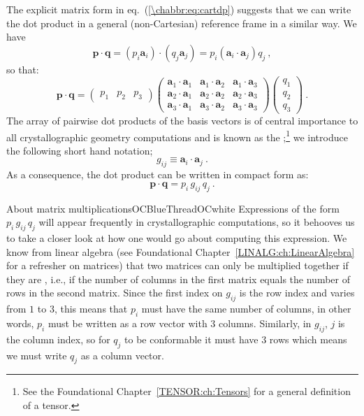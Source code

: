 The explicit matrix form in eq.~(\ref{\chabbr:eq:cartdp}) suggests that we can write the dot product in a general (non-Cartesian) reference frame in a similar way. We have
\[
	\mathbf{p}\cdot\mathbf{q} = (p_i\mathbf{a}_i)\cdot (q_j\mathbf{a}_j) = p_i(\mathbf{a}_i\cdot\mathbf{a}_j) q_j\ ,
\]
so that:
\begin{equation}
\mathbf{p}\cdot\mathbf{q} = \begin{pmatrix}p_1&p_2&p_3\end{pmatrix}\begin{pmatrix}	
	\mathbf{a}_1\cdot\mathbf{a}_1 & \mathbf{a}_1\cdot\mathbf{a}_2 & \mathbf{a}_1\cdot\mathbf{a}_3 \\
	\mathbf{a}_2\cdot\mathbf{a}_1 & \mathbf{a}_2\cdot\mathbf{a}_2 & \mathbf{a}_2\cdot\mathbf{a}_3 \\
	\mathbf{a}_3\cdot\mathbf{a}_1 & \mathbf{a}_3\cdot\mathbf{a}_2 & \mathbf{a}_3\cdot\mathbf{a}_3 \end{pmatrix}
	\begin{pmatrix}q_1\\ q_2\\ q_3\end{pmatrix}\ . \label{\chabbr:eq:generaldp}
\end{equation}
The array of pairwise dot products of the basis vectors is of central importance to all crystallographic geometry computations and is known as the ;\footnote{See the Foundational Chapter~\ref{TENSOR:ch:Tensors} for a general definition of a tensor.}  we introduce the following short hand notation;
\begin{equation}
	g_{ij}\equiv \mathbf{a}_i\cdot\mathbf{a}_j\ .\label{\chabbr:eq:metric}
\end{equation}
As a consequence, the dot product can be written in compact form as:
\begin{equation}
	\mathbf{p}\cdot\mathbf{q} = p_i\,g_{ij}\,q_j\ .\label{\chabbr:eq:dpgeneral}
\end{equation}

\begin{messagebox}{About matrix multiplications}{OCBlueThread}{\icinfo}{OCwhite}
	Expressions of the form $p_i\, g_{ij}\, q_j$ will  appear frequently in crystallographic computations, so it behooves us to take a closer look at how one would go about computing this expression.  We know from linear algebra (see Foundational Chapter~\ref{LINALG:ch:LinearAlgebra} for a refresher on matrices) that two matrices can only be multiplied together if they are , i.e., if the number of columns in the first matrix equals the number of rows in the second matrix. Since the first index on $g_{ij}$ is the row index and varies from $1$ to $3$, this means that $p_i$ must have the same number of columns, in other words, $p_i$ must be written as a row vector with $3$ columns.  Similarly, in $g_{ij}$, $j$ is the column index, so for $q_j$ to be conformable it must have $3$ rows which means we must write $q_j$ as a column vector.  
\end{messagebox}


